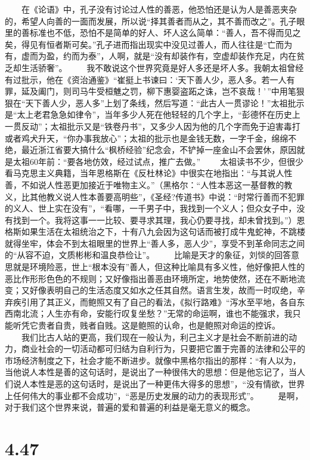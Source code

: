 \documentclass[]{book}
\begin{document}
　　在《论语》中，孔子没有讨论过人性的善恶，他恐怕还是认为人是善恶夹杂的，希望人向善的一面而发展，所以说``择其善者而从之，其不善而改之''。孔子眼里的善标准也不低，恐怕不是简单的好人、坏人这么简单：``善人，吾不得而见之矣，得见有恒者斯可矣。''孔子进而指出现实中没见过善人，而人往往是``亡而为有，虚而为盈，约而为泰''，人啊，就是``没有却装作有，空虚却装作充足，内在贫乏却生活骄奢''。
　　我不敢说这个世界究竟是好人多还是坏人多。我朝太祖曾经有过批示，他在《资治通鉴》``崔挺上书谏曰：`天下善人少，恶人多。若一人有罪，延及阖门，则司马牛受桓魋之罚，柳下惠婴盗跖之诛，岂不哀哉！'\,''中用笔狠狠在``天下善人少，恶人多''上划了条线，然后写道：``此古人一贯谬论！''太祖批示是``太上老君急急如律令''，当年多少人死在他轻轻的几个字上，``彭德怀在历史上一贯反动''；太祖批示又是``铁卷丹书''，又多少人因为他的几个字而免于迫害毒打或者鸡犬升天，``你办事我放心''；太祖的批示也是金钱无数，一字千金，绵绵不绝，最近浙江省要大搞什么``枫桥经验''纪念会，不铲掉一座金山不会罢休，原因就是太祖60年前：``要各地仿效，经过试点，推广去做。''
　　太祖读书不少，但很少看马克思主义典籍，当年恩格斯在《反杜林论》中很实在地指出：``与其说人性善，不如说人性恶更加接近于唯物主义。''（黑格尔：``人性本恶这一基督教的教义，比其他教义说人性本善要高明些''，《圣经?传道书》中说：``时常行善而不犯罪的义人、世上实在没有''，``看哪，一千男子中，我找到一个义人；但众女子中，没有找到一个。我将这事一一比较、要寻求其理，我心仍要寻找，却未曾找到。''）恩格斯如果生活在太祖统治之下，十有八九会因为这句话而被打成牛鬼蛇神，不跳楼就得坐牢，体会不到太祖眼里的世界上``善人多，恶人少''，享受不到革命同志之间的``从容不迫，文质彬彬和温良恭俭让''。
　　比喻是天才的象征，刘惔的回答意思就是环境险恶，世上``根本没有''善人，但这种比喻具有多义性，他好像把人性的恶比作形形色色的不规则；又好像指出善恶由环境所定，地势使然，还在不断地流变；又好像表明自己的生活态度又如水之任其自然。语言生发，故而一时叹绝，辛弃疾引用了其正义，而鲍照又有了自己的看法，《拟行路难》``泻水至平地，各自东西南北流；人生亦有命，安能行叹复坐愁？''无常的命运啊，谁也不能强求，我只能听凭它贵者自贵，贱者自贱。这是鲍照的认命，也是鲍照对命运的控诉。
　　我们比古人站的更高，我们现在一般认为，利己主义才是社会不断前进的动力，商业社会的一切活动都可归结为自利行为，只要把它置于完善的法律和公平的市场经济制度之下，社会才能不断进步。就像中黑格尔指出的那样：``有人以为，当他说人本性是善的这句话时，是说出了一种很伟大的思想：但是他忘记了，当人们说人本性是恶的这句话时，是说出了一种更伟大得多的思想''，``没有情欲，世界上任何伟大的事业都不会成功''，``恶是历史发展的动力的表现形式''。
　　是啊，对于我们这个世界来说，普遍的爱和普遍的利益是毫无意义的概念。

\section{4.47}\label{section-225}
\end{document}
